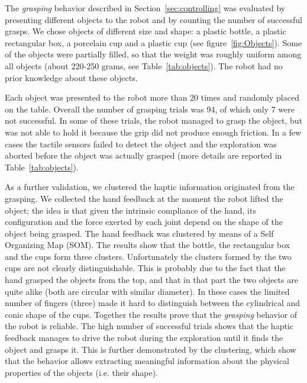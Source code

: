 
The \emph{grasping} behavior described in
Section~\ref{sec:controlling} was evaluated by presenting
different objects to the robot and by counting the number of
successful grasps. We chose objects of different size and shape: a
plastic bottle, a plastic rectangular box, a porcelain cup and a
plastic cup (see figure~\ref{fig:Objects}). Some of the objects
were partially filled, so that the weight was roughly uniform
among all objects (about 220-250 grams, see
Table~\ref{tab:objects}). The robot had no prior knowledge about
these objects.

Each object was presented to the robot more than 20 times and
randomly placed on the table. Overall the number of grasping
trials was 94, of which only 7 were not successful. In some of
these trials, the robot managed to grasp the object, but was not
able to hold it because the grip did not produce enough friction.
In a few cases the tactile sensors failed to detect the object and
the exploration was aborted before the object was actually grasped
(more details are reported in Table~\ref{tab:objects}).

As a further validation, we clustered the haptic information
originated from the grasping. We collected the hand feedback at
the moment the robot lifted the object; the idea is that given the
intrinsic compliance of the hand, its configuration and the force
exerted by each joint depend on the shape of the object being
grasped. The hand feedback was clustered by means of a Self
Organizing Map (SOM). The results show that the bottle, the
rectangular box and the cups form three clusters. Unfortunately
the clusters formed by the two cups are not clearly
distinguishable. This is probably due to the fact that the hand
grasped the objects from the top, and that in that part the two
objects are quite alike (both are circular with similar diameter).
In these cases the limited number of fingers (three) made it hard
to distinguish between the cylindrical and conic shape of the
cups. Together the results prove that the \emph{grasping} behavior
of the robot is reliable. The high number of successful trials
shows that the haptic feedback manages to drive the robot during
the exploration until it finds the object and grasps it. This is
further demonstrated by the clustering, which show that the
behavior allows extracting meaningful information about the
physical properties of the objects (i.e. their shape).


